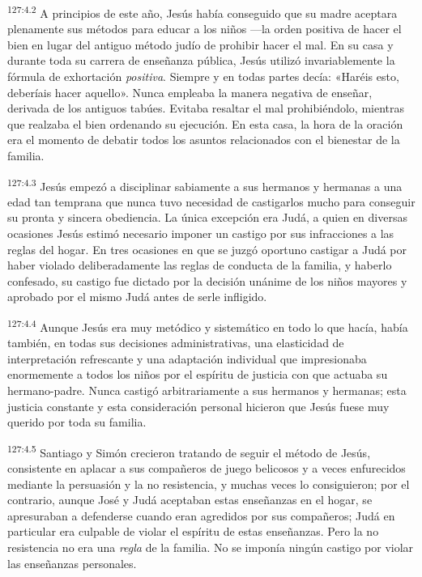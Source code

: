 \par 
\textsuperscript{127:4.2} A principios de este año, Jesús había conseguido que su madre aceptara plenamente sus métodos para educar a los niños ---la orden positiva de hacer el bien en lugar del antiguo método judío de prohibir hacer el mal. En su casa y durante toda su carrera de enseñanza pública, Jesús utilizó invariablemente la fórmula de exhortación \textit{positiva}. Siempre y en todas partes decía: «Haréis esto, deberíais hacer aquello». Nunca empleaba la manera negativa de enseñar, derivada de los antiguos tabúes. Evitaba resaltar el mal prohibiéndolo, mientras que realzaba el bien ordenando su ejecución. En esta casa, la hora de la oración era el momento de debatir todos los asuntos relacionados con el bienestar de la familia.

\par 
\textsuperscript{127:4.3} Jesús empezó a disciplinar sabiamente a sus hermanos y hermanas a una edad tan temprana que nunca tuvo necesidad de castigarlos mucho para conseguir su pronta y sincera obediencia. La única excepción era Judá, a quien en diversas ocasiones Jesús estimó necesario imponer un castigo por sus infracciones a las reglas del hogar. En tres ocasiones en que se juzgó oportuno castigar a Judá por haber violado deliberadamente las reglas de conducta de la familia, y haberlo confesado, su castigo fue dictado por la decisión unánime de los niños mayores y aprobado por el mismo Judá antes de serle infligido.

\par 
\textsuperscript{127:4.4} Aunque Jesús era muy metódico y sistemático en todo lo que hacía, había también, en todas sus decisiones administrativas, una elasticidad de interpretación refrescante y una adaptación individual que impresionaba enormemente a todos los niños por el espíritu de justicia con que actuaba su hermano-padre. Nunca castigó arbitrariamente a sus hermanos y hermanas; esta justicia constante y esta consideración personal hicieron que Jesús fuese muy querido por toda su familia.

\par 
\textsuperscript{127:4.5} Santiago y Simón crecieron tratando de seguir el método de Jesús, consistente en aplacar a sus compañeros de juego belicosos y a veces enfurecidos mediante la persuasión y la no resistencia, y muchas veces lo consiguieron; por el contrario, aunque José y Judá aceptaban estas enseñanzas en el hogar, se apresuraban a defenderse cuando eran agredidos por sus compañeros; Judá en particular era culpable de violar el espíritu de estas enseñanzas. Pero la no resistencia no era una \textit{regla} de la familia. No se imponía ningún castigo por violar las enseñanzas personales.

